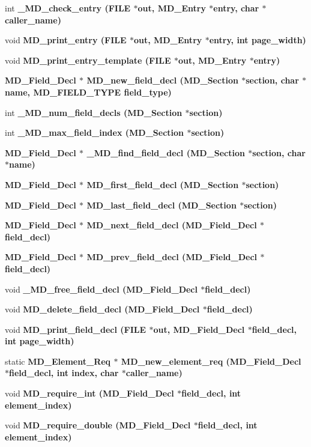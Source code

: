 \begin{CompactItemize}
\item 
int \bf{\_\-MD\_\-check\_\-entry} (FILE $\ast$out, \bf{MD\_\-Entry} $\ast$\bf{entry}, char $\ast$caller\_\-name)
\item 
void \bf{MD\_\-print\_\-entry} (FILE $\ast$out, \bf{MD\_\-Entry} $\ast$\bf{entry}, int page\_\-width)
\item 
void \bf{MD\_\-print\_\-entry\_\-template} (FILE $\ast$out, \bf{MD\_\-Entry} $\ast$\bf{entry})
\item 
\bf{MD\_\-Field\_\-Decl} $\ast$ \bf{MD\_\-new\_\-field\_\-decl} (\bf{MD\_\-Section} $\ast$section, char $\ast$\bf{name}, \bf{MD\_\-FIELD\_\-TYPE} field\_\-type)
\item 
int \bf{\_\-MD\_\-num\_\-field\_\-decls} (\bf{MD\_\-Section} $\ast$section)
\item 
int \bf{\_\-MD\_\-max\_\-field\_\-index} (\bf{MD\_\-Section} $\ast$section)
\item 
\bf{MD\_\-Field\_\-Decl} $\ast$ \bf{\_\-MD\_\-find\_\-field\_\-decl} (\bf{MD\_\-Section} $\ast$section, char $\ast$\bf{name})
\item 
\bf{MD\_\-Field\_\-Decl} $\ast$ \bf{MD\_\-first\_\-field\_\-decl} (\bf{MD\_\-Section} $\ast$section)
\item 
\bf{MD\_\-Field\_\-Decl} $\ast$ \bf{MD\_\-last\_\-field\_\-decl} (\bf{MD\_\-Section} $\ast$section)
\item 
\bf{MD\_\-Field\_\-Decl} $\ast$ \bf{MD\_\-next\_\-field\_\-decl} (\bf{MD\_\-Field\_\-Decl} $\ast$field\_\-decl)
\item 
\bf{MD\_\-Field\_\-Decl} $\ast$ \bf{MD\_\-prev\_\-field\_\-decl} (\bf{MD\_\-Field\_\-Decl} $\ast$field\_\-decl)
\item 
void \bf{\_\-MD\_\-free\_\-field\_\-decl} (\bf{MD\_\-Field\_\-Decl} $\ast$field\_\-decl)
\item 
void \bf{MD\_\-delete\_\-field\_\-decl} (\bf{MD\_\-Field\_\-Decl} $\ast$field\_\-decl)
\item 
void \bf{MD\_\-print\_\-field\_\-decl} (FILE $\ast$out, \bf{MD\_\-Field\_\-Decl} $\ast$field\_\-decl, int page\_\-width)
\item 
static \bf{MD\_\-Element\_\-Req} $\ast$ \bf{MD\_\-new\_\-element\_\-req} (\bf{MD\_\-Field\_\-Decl} $\ast$field\_\-decl, int index, char $\ast$caller\_\-name)
\item 
void \bf{MD\_\-require\_\-int} (\bf{MD\_\-Field\_\-Decl} $\ast$field\_\-decl, int element\_\-index)
\item 
void \bf{MD\_\-require\_\-double} (\bf{MD\_\-Field\_\-Decl} $\ast$field\_\-decl, int element\_\-index)

\end{CompactItemize}

